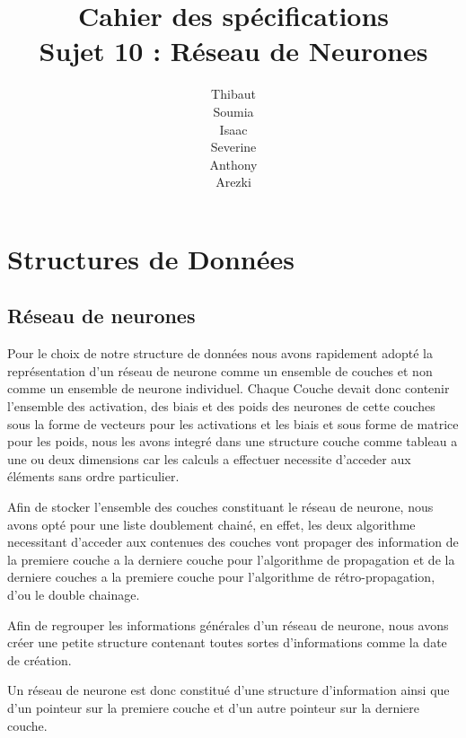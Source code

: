 \documentclass{article}
\begin{document}
\newpage
\title{Cahier des spécifications\\Sujet 10 : Réseau de Neurones}
\author{Thibaut \\Soumia {}\\Isaac {}\\Severine {}\\Anthony {}\\Arezki {}}
\maketitle

\newpage

\small{\tableofcontents}

\newpage

\section{Structures de Données}
	\subsection{Réseau de neurones}
	Pour le choix de notre structure de données nous avons rapidement adopté la représentation d'un réseau de neurone comme un ensemble de couches et non comme un ensemble de neurone individuel. Chaque Couche devait donc contenir l'ensemble des activation, des biais et des poids des neurones de cette couches sous la forme de vecteurs pour les activations et les biais et sous forme de matrice pour les poids, nous les avons integré dans une structure couche comme tableau a une ou deux dimensions car les calculs a effectuer necessite d'acceder aux éléments sans ordre particulier.
	
	Afin de stocker l'ensemble des couches constituant le réseau de neurone, nous avons opté pour une liste doublement chainé, en effet, les deux algorithme necessitant d'acceder aux contenues des couches vont propager des information de la premiere couche a la derniere couche pour l'algorithme de propagation et de la derniere couches a la premiere couche pour l'algorithme de rétro-propagation, d'ou le double chainage.
	
	Afin de regrouper les informations générales d'un réseau de neurone, nous avons créer une petite structure contenant toutes sortes d'informations comme la date de création.
	
	Un réseau de neurone est donc constitué d'une structure d'information ainsi que d'un pointeur sur la premiere couche et d'un autre pointeur sur la derniere couche.
\end{document}
